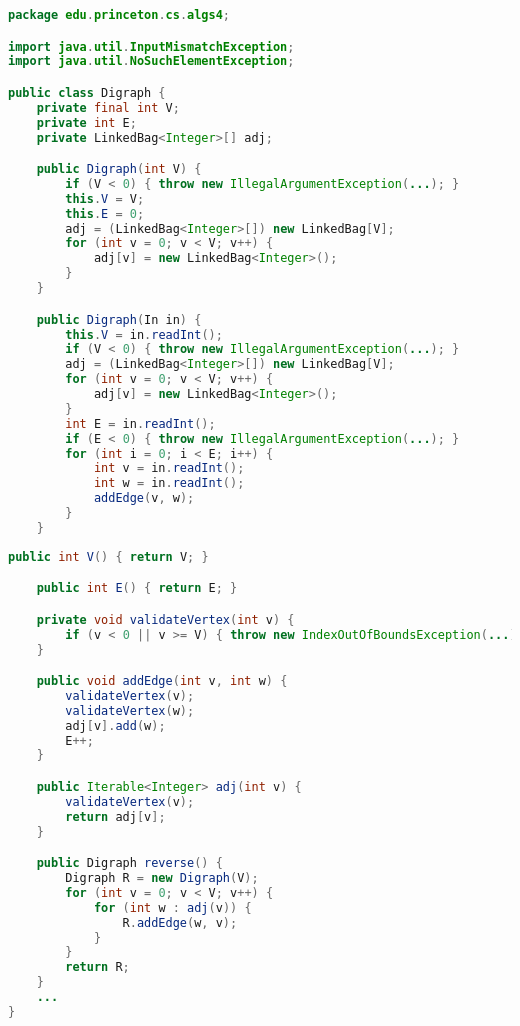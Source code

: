 \documentclass[8pt,a4paper,compress]{beamer}
\begin{document}
\begin{frame}[fragile]
\begin{lstlisting}[language=Java]
package edu.princeton.cs.algs4;

import java.util.InputMismatchException;
import java.util.NoSuchElementException;

public class Digraph {
    private final int V;
    private int E;
    private LinkedBag<Integer>[] adj;

    public Digraph(int V) {
        if (V < 0) { throw new IllegalArgumentException(...); }
        this.V = V;
        this.E = 0;
        adj = (LinkedBag<Integer>[]) new LinkedBag[V];
        for (int v = 0; v < V; v++) {
            adj[v] = new LinkedBag<Integer>();
        }
    }

    public Digraph(In in) {
        this.V = in.readInt();
        if (V < 0) { throw new IllegalArgumentException(...); }
        adj = (LinkedBag<Integer>[]) new LinkedBag[V];
        for (int v = 0; v < V; v++) {
            adj[v] = new LinkedBag<Integer>();
        }
        int E = in.readInt();
        if (E < 0) { throw new IllegalArgumentException(...); }
        for (int i = 0; i < E; i++) {
            int v = in.readInt();
            int w = in.readInt();
            addEdge(v, w); 
        }
    }
\end{lstlisting}
\end{frame}

\begin{frame}[fragile]
\begin{lstlisting}[language=Java]
    public int V() { return V; }

    public int E() { return E; }

    private void validateVertex(int v) {
        if (v < 0 || v >= V) { throw new IndexOutOfBoundsException(...); }
    }

    public void addEdge(int v, int w) {
        validateVertex(v);
        validateVertex(w);
        adj[v].add(w);
        E++;
    }

    public Iterable<Integer> adj(int v) {
        validateVertex(v);
        return adj[v];
    }

    public Digraph reverse() {
        Digraph R = new Digraph(V);
        for (int v = 0; v < V; v++) {
            for (int w : adj(v)) {
                R.addEdge(w, v);
            }
        }
        return R;
    }
    ...
}
\end{lstlisting}
\end{frame}
\end{document}
